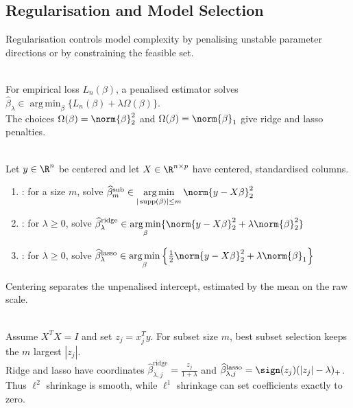\subsection{Regularisation and Model Selection}

Regularisation controls model complexity by penalising unstable parameter directions or by constraining the feasible set.

\begin{definition} \label{def:sl-penalized-linear-estimator} \\
For empirical loss $L_n(\beta)$, a penalised estimator solves $\widehat{\beta}_{\lambda}\in \operatorname*{arg\,min}_{\beta} \{L_n(\beta)+\lambda\Omega(\beta)\}$.\\
The choices $\Omega(\beta)=\norm{\beta}_2^2$ and $\Omega(\beta)=\norm{\beta}_1$ give ridge and lasso penalties.
\end{definition}

\begin{definition} \label{def:sl-subset-ridge-lasso-linear-models} \\
Let $y\in\R^n$ be centered and let $X\in\R^{n\times p}$ have centered, standardised columns.
\begin{enumerate}[label=(\roman*)]
\setlength{\itemsep}{0pt}
\item {}: for a size $m$, solve $\widehat{\beta}^{\mathrm{sub}}_m\in \operatorname*{arg\,min}\limits_{|\operatorname{supp}(\beta)|\leq m}\norm{y-X\beta}_2^2$
\item {}: for $\lambda\geq0$, solve $\widehat{\beta}^{\mathrm{ridge}}_\lambda\in \operatorname*{arg\,min}\limits_{\beta} \{\norm{y-X\beta}_2^2+\lambda\norm{\beta}_2^2\}$
\item {}: for $\lambda\geq0$, solve $\widehat{\beta}^{\mathrm{lasso}}_\lambda\in \operatorname*{arg\,min}\limits_{\beta} \left\{\frac12\norm{y-X\beta}_2^2+\lambda\norm{\beta}_1\right\}$
\end{enumerate}
Centering separates the unpenalised intercept, estimated by the mean on the raw scale.
\end{definition}

\begin{remark} \label{rem:sl-ridge-lasso-geometry} \\
Assume $X^TX=I$ and set $z_j=x_j^Ty$. For subset size $m$, best subset selection keeps the $m$ largest $|z_j|$.\\
Ridge and lasso have coordinates $\widehat{\beta}^{\mathrm{ridge}}_{\lambda,j}=\frac{z_j}{1+\lambda}$ and $\widehat{\beta}^{\mathrm{lasso}}_{\lambda,j}=\sign(z_j)(|z_j|-\lambda)_+$.\\
Thus $\ell^2$ shrinkage is smooth, while $\ell^1$ shrinkage can set coefficients exactly to zero.
\end{remark}

